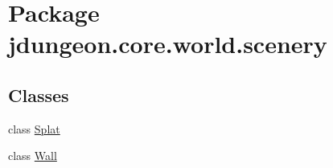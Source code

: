 \hypertarget{namespacejdungeon_1_1core_1_1world_1_1scenery}{
\section{Package jdungeon.core.world.scenery}
\label{namespacejdungeon_1_1core_1_1world_1_1scenery}
}
\subsection*{Classes}
\begin{DoxyCompactItemize}
\item 
class \hyperlink{classjdungeon_1_1core_1_1world_1_1scenery_1_1_splat}{Splat}
\item 
class \hyperlink{classjdungeon_1_1core_1_1world_1_1scenery_1_1_wall}{Wall}
\end{DoxyCompactItemize}
